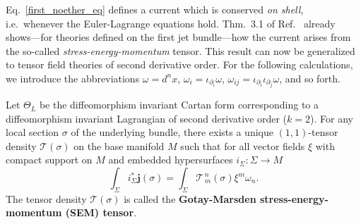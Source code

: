Eq.\ \ref{first_noether_eq} defines a current which is conserved \emph{on shell}, i.e.\ whenever the Euler-Lagrange equations hold. Thm.\ 3.1 of Ref.\ \cite{Gotay_1992} already shows---for theories defined on the first jet bundle---how the current arises from the so-called \emph{stress-energy-momentum} tensor. This result can now be generalized to tensor field theories of second derivative order. For the following calculations, we introduce the abbreviations $\omega=d^nx$, $\omega_i = \iota_{\partial_i} \omega$, $\omega_{ij} = \iota_{\partial_i} \iota_{\partial_j} \omega$, and so forth.
\begin{theorem}\label{sem_thm}
  Let $\Theta_L$ be the diffeomorphism invariant Cartan form corresponding to a diffeomorphism invariant Lagrangian of second derivative order ($k=2$). For any local section $\sigma$ of the underlying bundle, there exists a unique $(1,1)$-tensor density $\mathcal T(\sigma)$ on the base manifold $M$ such that for all vector fields $\xi$ with compact support on $M$ and embedded hypersurfaces $i_\Sigma \colon \Sigma \rightarrow M$
  \begin{equation}\label{sem_definition}
    \int_\Sigma i_\Sigma^\ast\boldsymbol{j}(\sigma) = \int_\Sigma \mathcal T^{\,n}_{\,m}(\sigma)\xi^m \omega_n.
  \end{equation}
  The tensor density $\mathcal T(\sigma)$ is called the \textbf{Gotay-Marsden stress-energy-momentum (SEM) tensor}.
\end{theorem}
